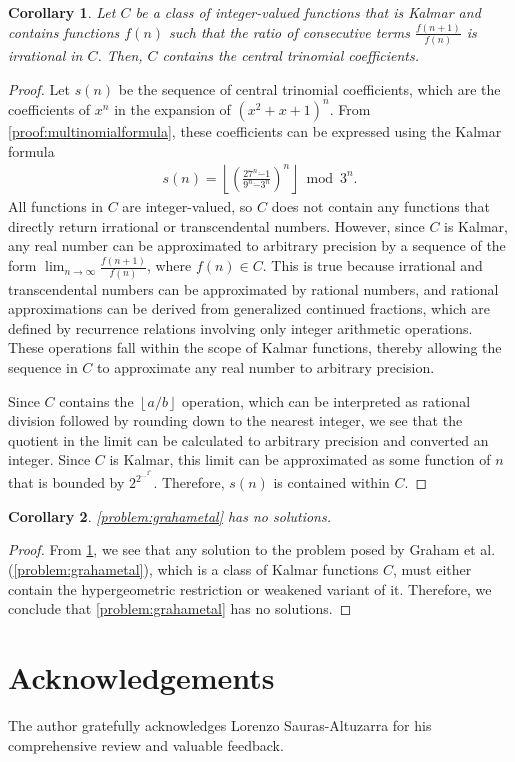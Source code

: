 \documentclass[10pt,a4paper]{article}
\theoremstyle{plain}
\newtheorem{corollary}{Corollary}[section]
\newcommand{\floor}[1]{\left\lfloor #1 \right\rfloor}
\begin{document}
\begin{corollary} \label{proof:trinomialnoclass}
Let $C$ be a class of integer-valued functions that is Kalmar and contains functions $f(n)$ such that the ratio of consecutive terms $\frac{f(n+1)}{f(n)}$ is irrational in $C$. Then, $C$ contains the central trinomial coefficients.
\end{corollary}
\begin{proof}
Let $s(n)$ be the sequence of central trinomial coefficients, which are the coefficients of $x^n$ in the expansion of $(x^2+x+1)^n$. From \cref{proof:multinomialformula}, these coefficients can be expressed using the Kalmar formula
\begin{align*}
s(n) = \floor{\left(\frac{27^n \dot{-} 1}{9^n \dot{-} 3^n}\right)^n} \bmod 3^n .
\end{align*}
All functions in $C$ are integer-valued, so $C$ does not contain any functions that directly return irrational or transcendental numbers. However, since $C$ is Kalmar, any real number can be approximated to arbitrary precision by a sequence of the form $\lim_{n \to \infty} \frac{f(n+1)}{f(n)}$, where $f(n) \in C$. This is true because irrational and transcendental numbers can be approximated by rational numbers, and rational approximations can be derived from generalized continued fractions, which are defined by recurrence relations involving only integer arithmetic operations. These operations fall within the scope of Kalmar functions, thereby allowing the sequence in $C$ to approximate any real number to arbitrary precision.

Since $C$ contains the $\floor{a/b}$ operation, which can be interpreted as rational division followed by rounding down to the nearest integer, we see that the quotient in the limit can be calculated to arbitrary precision and converted an integer. Since $C$ is Kalmar, this limit can be approximated as some function of $n$ that is bounded by $2^{2^{...^{2^n}}}$. Therefore, $s(n)$ is contained within $C$.
\end{proof}

\begin{corollary}
\cref{problem:grahametal} has no solutions.
\end{corollary}
\begin{proof}
From \cref{proof:trinomialnoclass}, we see that any solution to the problem posed by Graham et al. (\cref{problem:grahametal}), which is a class of Kalmar functions $C$, must either contain the hypergeometric restriction or weakened variant of it. Therefore, we conclude that \cref{problem:grahametal} has no solutions.
\end{proof}

\section{Acknowledgements}
The author gratefully acknowledges Lorenzo Sauras-Altuzarra for his comprehensive review and valuable feedback.

\footnotesize
\setlength{\parskip}{0.0em}
\baselineskip=0.0in
\setlength{\parindent}{0pt}
\begingroup
\raggedright


\endgroup
\end{document}
